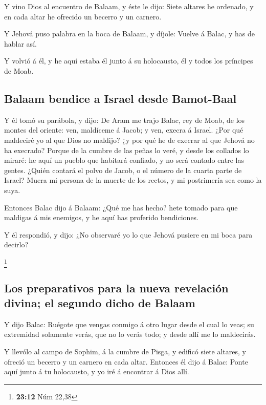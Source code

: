  Y vino Dios al encuentro de Balaam, y éste le dijo: Siete
altares he ordenado, y en cada altar he ofrecido un becerro y un
carnero.

 Y Jehová puso palabra en la boca de Balaam, y díjole:
Vuelve á Balac, y has de hablar así.

 Y volvió á él, y he aquí estaba él junto á su holocausto,
él y todos los príncipes de Moab.

\hypertarget{balaam-bendice-a-israel-desde-bamot-baal}{%
\subsection{Balaam bendice a Israel desde
Bamot-Baal}\label{balaam-bendice-a-israel-desde-bamot-baal}}

 Y él tomó su parábola, y dijo: De Aram me trajo Balac,
rey de Moab, de los montes del oriente: ven, maldíceme á Jacob; y ven,
execra á Israel.  ¿Por qué maldeciré yo al que Dios no
maldijo? ¿y por qué he de execrar al que Jehová no ha execrado?
 Porque de la cumbre de las peñas lo veré, y desde los
collados lo miraré: he aquí un pueblo que habitará confiado, y no será
contado entre las gentes.  ¿Quién contará el polvo de
Jacob, o el número de la cuarta parte de Israel? Muera mi persona de la
muerte de los rectos, y mi postrimería sea como la suya.

 Entonces Balac dijo á Balaam: ¿Qué me has hecho? hete
tomado para que maldigas á mis enemigos, y he aquí has proferido
bendiciones.

 Y él respondió, y dijo: ¿No observaré yo lo que Jehová
pusiere en mi boca para decirlo?

\footnote{\textbf{23:12} Núm 22,38}

\hypertarget{los-preparativos-para-la-nueva-revelaciuxf3n-divina-el-segundo-dicho-de-balaam}{%
\subsection{Los preparativos para la nueva revelación divina; el segundo
dicho de
Balaam}\label{los-preparativos-para-la-nueva-revelaciuxf3n-divina-el-segundo-dicho-de-balaam}}

 Y dijo Balac: Ruégote que vengas conmigo á otro lugar
desde el cual lo veas; su extremidad solamente verás, que no lo verás
todo; y desde allí me lo maldecirás.

 Y llevólo al campo de Sophim, á la cumbre de Pisga, y
edificó siete altares, y ofreció un becerro y un carnero en cada altar.
 Entonces él dijo á Balac: Ponte aquí junto á tu
holocausto, y yo iré á encontrar á Dios allí.

